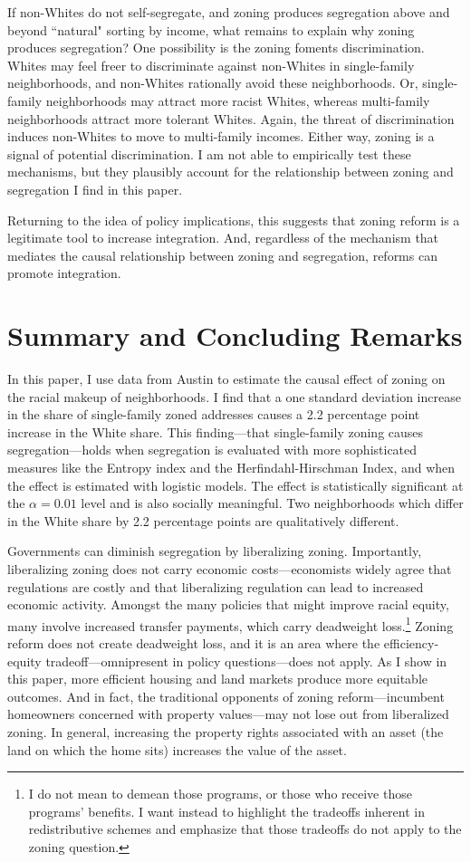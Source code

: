 \documentclass[11pt]{article}
\begin{document}
If non-Whites do not self-segregate, and zoning produces segregation above and beyond ``natural" sorting by income, what remains to explain why zoning produces segregation? One possibility is the zoning foments discrimination. Whites may feel freer to discriminate against non-Whites in single-family neighborhoods, and non-Whites rationally avoid these neighborhoods. Or, single-family neighborhoods may attract more racist Whites, whereas multi-family neighborhoods attract more tolerant Whites. Again, the threat of discrimination induces non-Whites to move to multi-family incomes. Either way, zoning is a signal of potential discrimination. I am not able to empirically test these mechanisms, but they plausibly account for the relationship between zoning and segregation I find in this paper.

Returning to the idea of policy implications, this suggests that zoning reform is a legitimate tool to increase integration. And, regardless of the mechanism that mediates the causal relationship between zoning and segregation, reforms can promote integration.

\section{Summary and Concluding Remarks}

In this paper, I use data from Austin to estimate the causal effect of zoning on the racial makeup of neighborhoods. I find that a one standard deviation increase in the share of single-family zoned addresses causes a 2.2 percentage point increase in the White share. This finding---that single-family zoning causes segregation---holds when segregation is evaluated with more sophisticated measures like the Entropy index and the Herfindahl-Hirschman Index, and when the effect is estimated with logistic models. The effect is statistically significant at the $\alpha=0.01$ level and is also socially meaningful. Two neighborhoods which differ in the White share by 2.2 percentage points are qualitatively different.

Governments can diminish segregation by liberalizing zoning. Importantly, liberalizing zoning does not carry economic costs---economists widely agree that regulations are costly and that liberalizing regulation can lead to increased economic activity. Amongst the many policies that might improve racial equity, many involve increased transfer payments, which carry deadweight loss.\footnote{I do not mean to demean those programs, or those who receive those programs' benefits. I want instead to highlight the tradeoffs inherent in redistributive schemes and emphasize that those tradeoffs do not apply to the zoning question.} Zoning reform does not create deadweight loss, and it is an area where the efficiency-equity tradeoff---omnipresent in policy questions---does not apply. As I show in this paper, more efficient housing and land markets produce more equitable outcomes. And in fact, the traditional opponents of zoning reform---incumbent homeowners concerned with property values---may not lose out from liberalized zoning. In general, increasing the property rights associated with an asset (the land on which the home sits) increases the value of the asset.
\end{document}
